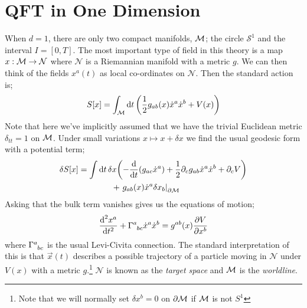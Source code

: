 \section{QFT in One Dimension}
When $d = 1$, there are only two compact manifolds, $\mathcal{M}$; the circle $\mathcal{S}^1$ and the interval $I = [0, T]$. The most important type of field in this theory is a map $x : \mathcal{M} \rightarrow \mathcal{N}$ where $\mathcal{N}$ is a Riemannian manifold with a metric $g$. We can then think of the fields $x^{a}(t)$ as local co-ordinates on $\mathcal{N}$. Then the standard action is;
\begin{equation}
S[x] = \int_{\mM}{\upd{t}\left(\frac{1}{2}g_{ab}(x)\dot{x}^{a}\dot{x}^{b} + V(x)\right)}
\end{equation}
Note that here we've implicitly assumed that we have the trivial Euclidean metric $\delta_{tt} = 1$ on $\mathcal{M}$. Under small variations $x \mapsto x + \delta x$ we find the usual geodesic form with a potential term;
\begin{align*}
\delta S[x] &= \int{\upd{t}\delta x\left(-\frac{\ud}{\ud t}(g_{ac}\dot{x}^{a}) + \frac{1}{2}\del_c g_{ab}\dot{x}^{a}\dot{x}^{b} + \del_c V\right)} \\
&\qquad\qquad + \left.g_{ab}(x)\dot{x}^{a}\delta x_b\right|_{\del \mM}
\end{align*}
Asking that the bulk term vanishes gives us the equations of motion;
\begin{equation}
\frac{\ud^2 x^{a}}{\ud t^2} + \Gamma\indices{^{a}_{bc}}\dot{x}^{a}\dot{x}^{b} = g^{ab}(x)\frac{\del V}{\del x^{b}}
\end{equation}
where $\Gamma\indices{^{a}_{bc}}$ is the usual Levi-Civita connection. The standard interpretation of this is that $\vec{x}(t)$ describes a possible trajectory of a particle moving in $\mathcal{N}$ under $V(x)$ with a metric $g$.\footnote{Note that we will normally set $\delta x^{b} = 0$ on $\partial\mathcal{M}$ if $\mathcal{M}$ is not $S^{1}$} $\mathcal{N}$ is known as the \emph{target space} and $\mathcal{M}$ is the \emph{worldline}.

